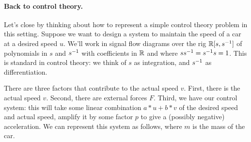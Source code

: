 \documentclass[7Sketches]{subfiles}
\begin{document}
\paragraph{Back to control theory.}%

Let's close by thinking about how to represent a simple control theory problem
in this setting. Suppose we want to design a system to maintain the speed of a
car at a desired speed $u$. We'll work in signal flow diagrams over the rig
$\mathbb{R}[s,s^{-1}]$ of polynomials in $s$ and $s^{-1}$ with coefficients in $\mathbb{R}$ and
where $ss^{-1}=s^{-1} s=1$. This is standard in control theory: we think of $s$ as
integration, and $s^{-1}$ as differentiation.

There are three factors that contribute to the actual speed
$v$. First, there is the actual speed $v$. Second, there are external forces
$F$. Third, we have our control system: this will take some linear combination
$a*u+b*v$ of the desired speed and actual speed, amplify it by some factor $p$ to give a (possibly
negative) acceleration. We can represent this system as follows, where $m$ is the
mass of the car.
\end{document}
